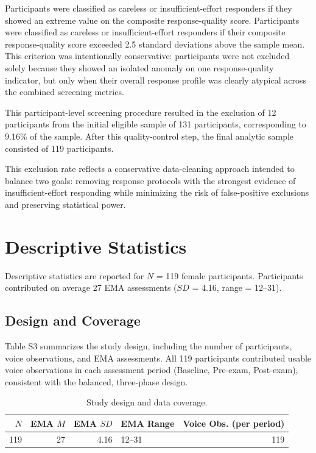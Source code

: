 \documentclass[
  english,
  man,floatsintext]{apa6}
\begin{document}
Participants were classified as careless or insufficient-effort responders if they showed an extreme value on the composite response-quality score. Participants were classified as careless or insufficient-effort responders if their composite response-quality score exceeded 2.5 standard deviations above the sample mean. This criterion was intentionally conservative: participants were not excluded solely because they showed an isolated anomaly on one response-quality indicator, but only when their overall response profile was clearly atypical across the combined screening metrics.

This participant-level screening procedure resulted in the exclusion of 12 participants from the initial eligible sample of 131 participants, corresponding to 9.16\% of the sample. After this quality-control step, the final analytic sample consisted of 119 participants.

This exclusion rate reflects a conservative data-cleaning approach intended to balance two goals: removing response protocols with the strongest evidence of insufficient-effort responding while minimizing the risk of false-positive exclusions and preserving statistical power.

\newpage

\section{Descriptive Statistics}\label{descriptive-statistics}

Descriptive statistics are reported for \(N\) = 119 female participants. Participants contributed on average 27 EMA assessments (\(SD\) = 4.16, range = 12--31).

\subsection{Design and Coverage}\label{design-and-coverage}

Table S3 summarizes the study design, including the number of participants, voice observations, and EMA assessments. All 119 participants contributed usable voice observations in each assessment period (Baseline, Pre-exam, Post-exam), consistent with the balanced, three-phase design.

\begin{table}

\caption{\label{tab:table-s3-design}Study design and data coverage.}
\centering
\begin{tabular}[t]{rrrlr}
\toprule
$N$ & EMA $M$ & EMA $SD$ & EMA Range & Voice Obs. (per period)\\
\midrule
119 & 27 & 4.16 & 12--31 & 119\\
\bottomrule
\end{tabular}
\end{table}
\end{document}
